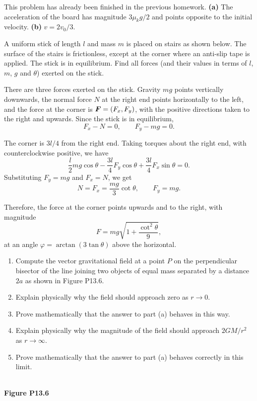 \documentclass{article}
\begin{document}
\begin{solution}
	This problem has already been finished in the previous homework. \textbf{(a)} The acceleration of the board has magnitude $3\mu_k g/2$ and points opposite to the initial velocity. \textbf{(b)} $v = 2v_0/3$.
\end{solution}



\begin{problem}
A uniform stick of length $l$ and mass $m$ is placed on stairs as shown below. The surface of the stairs is frictionless, except at the corner where an anti-slip tape is applied. The stick is in equilibrium. Find all forces (and their values in terms of $l$, $m$, $g$ and $\theta$) exerted on the stick.
\begin{center}
  
\end{center}
\end{problem}

\begin{solution}
	There are three forces exerted on the stick. Gravity $mg$ points vertically downwards, the normal force $N$ at the right end points horizontally to the left, and the force at the corner is $\boldsymbol{F} = (F_x,F_y)$, with the positive directions taken to the right and upwards. Since the stick is in equilibrium,
	\[ F_x - N = 0, \qquad F_y - mg = 0. \]

	The corner is $3l/4$ from the right end. Taking torques about the right end, with counterclockwise positive, we have
	\[ \frac{l}{2}mg\cos\theta - \frac{3l}{4}F_y\cos\theta + \frac{3l}{4}F_x\sin\theta = 0. \]
	Substituting $F_y = mg$ and $F_x = N$, we get
	\[ N = F_x = \frac{mg}{3}\cot\theta, \qquad F_y = mg. \]

	Therefore, the force at the corner points upwards and to the right, with magnitude
	\[ F = mg\sqrt{1 + \frac{\cot^2\theta}{9}}, \]
	at an angle $\varphi = \arctan(3\tan\theta)$ above the horizontal.
\end{solution}



\begin{problem}
\begin{enumerate}
  \item[(a)] Compute the vector gravitational field at a point $P$ on the perpendicular bisector of the line joining two objects of equal mass separated by a distance $2a$ as shown in Figure P13.6.
  \item[(b)] Explain physically why the field should approach zero as $r \to 0$.
  \item[(c)] Prove mathematically that the answer to part (a) behaves in this way.
  \item[(d)] Explain physically why the magnitude of the field should approach $2GM/r^2$ as $r \to \infty$.
  \item[(e)] Prove mathematically that the answer to part (a) behaves correctly in this limit.
\end{enumerate}
\begin{center}
  \\[.4em]
  {\normalfont\bfseries Figure P13.6}
\end{center}
\end{problem}
\end{document}
